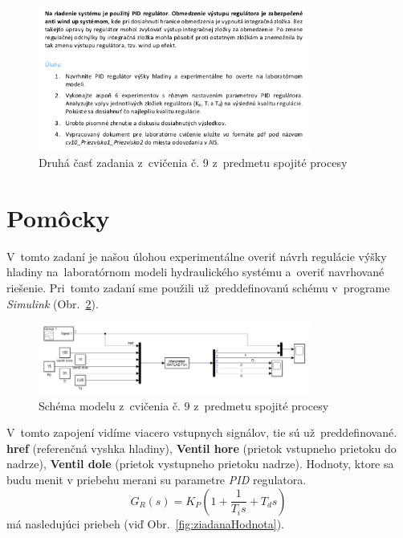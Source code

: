 \documentclass{article}
\begin{document}
\begin{figure}[!htbp]
	\begin{center}
		\includegraphics[width=0.8\textwidth]{./include/zadaniep2.png}
	\end{center}
	\caption{Druhá časť zadania z~cvičenia č. 9 z~predmetu spojité procesy}
		\label{fig:zadanie2}
\end{figure}

\clearpage

\section{Pomôcky}
\label{sec:pomocky}

V~tomto zadaní je našou úlohou experimentálne overiť návrh regulácie výšky hladiny na~laboratórnom
modeli hydraulického systému a~overiť navrhované riešenie. Pri~tomto zadaní sme použili už~preddefinovanú schému
v~programe \textit{Simulink} (Obr.~\ref{fig:schema}).

\begin{figure}[!htbp]
	\begin{center}
		\includegraphics[width=0.8\textwidth]{./include/schema.png}
	\end{center}
	\caption{Schéma modelu z~cvičenia č. 9 z~predmetu spojité procesy}
	\label{fig:schema}
\end{figure}

V~tomto zapojení vidíme viacero vstupnych signálov, tie sú už~preddefinované. \textbf{href} (referenčná vyshka hladiny), \textbf{Ventil hore} (prietok vstupneho prietoku do nadrze), \textbf{Ventil dole} (prietok vystupneho prietoku nadrze). Hodnoty, ktore sa budu menit v priebehu merani su parametre \textit{PID} regulatora. \\
$$ G_R(s) = K_P \left( 1 + \frac{1}{T_is} + T_ds \right) $$
má nasledujúci priebeh (viď Obr.~\ref{fig:ziadanaHodnota}).
\end{document}
